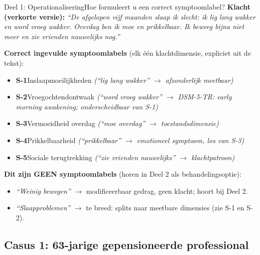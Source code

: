 \documentclass[11pt,a4paper]{article}
\begin{document}
\begin{voorbeeldbox}{Deel 1: Operationalisering}{Hoe formuleert u een correct symptoomlabel?}
\small
\textbf{Klacht (verkorte versie):} \textit{``De afgelopen vijf maanden slaap ik slecht:
ik lig lang wakker en word vroeg wakker. Overdag ben ik moe en prikkelbaar. Ik beweeg
bijna niet meer en zie vrienden nauwelijks nog.''}

\medskip
\textbf{Correct ingevulde symptoomlabels} (elk één klachtdimensie, expliciet uit de tekst):
\begin{itemize}[topsep=2pt,itemsep=1pt]
\item \textbf{S-1}\enspace Inslaapmoeilijkheden
  \hfill\textit{(``lig lang wakker'' $\rightarrow$ afzonderlijk meetbaar)}
\item \textbf{S-2}\enspace Vroegochtendontwaak
  \hfill\textit{(``word vroeg wakker'' $\rightarrow$ DSM-5-TR: early morning awakening; onderscheidbaar van S-1)}
\item \textbf{S-3}\enspace Vermoeidheid overdag
  \hfill\textit{(``moe overdag'' $\rightarrow$ toestandsdimensie)}
\item \textbf{S-4}\enspace Prikkelbaarheid
  \hfill\textit{(``prikkelbaar'' $\rightarrow$ emotioneel symptoom, los van S-3)}
\item \textbf{S-5}\enspace Sociale terugtrekking
  \hfill\textit{(``zie vrienden nauwelijks'' $\rightarrow$ klachtpatroon)}
\end{itemize}

\medskip
\textbf{\color{StrongRed}Dit zijn GEEN symptoomlabels} (horen in Deel 2 als behandelingsoptie):
\begin{itemize}[topsep=1pt,itemsep=0pt]
\item \textit{``Weinig bewegen''} $\rightarrow$ modificeerbaar gedrag, geen klacht; hoort bij Deel 2.
\item \textit{``Slaapproblemen''} $\rightarrow$ te breed: splits naar meetbare dimensies (zie S-1 en S-2).
\end{itemize}
\end{voorbeeldbox}

\vspace{0.5em}

\newpage

\subsection*{Casus 1: 63-jarige gepensioneerde professional}
\end{document}
